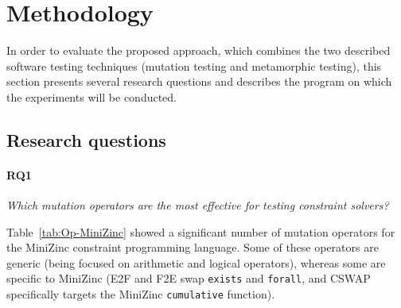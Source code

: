 \section{Methodology}
In order to evaluate the proposed approach, which combines the two described
software testing techniques (mutation testing and metamorphic
testing),
this section presents several research questions and
describes the program on which the experiments will be conducted.










\subsection{Research questions}

\newcommand{\rqoperators}{RQ1}
\newcommand{\rqmetamorphic}{RQ2}
\newcommand{\rqidentifying}{RQ3}

\paragraph{\rqoperators} \emph{Which mutation operators are the most effective for testing constraint solvers?}

Table~\ref{tab:Op-MiniZinc} showed a significant number of mutation operators for the MiniZinc constraint programming language. Some of these operators are generic (being focused on arithmetic and logical operators), whereas some are specific to MiniZinc (E2F and F2E swap \texttt{exists} and \texttt{forall}, and CSWAP specifically targets the MiniZinc \texttt{cumulative} function).

